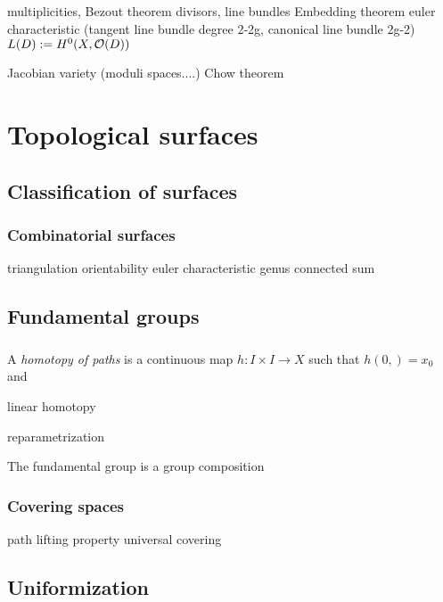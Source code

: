 \documentclass{../../large}
\begin{document}
multiplicities, Bezout theorem
divisors, line bundles
Embedding theorem
euler characteristic
(tangent line bundle degree 2-2g, canonical line bundle 2g-2)
$L(D):=H^0(X,\mathcal{O}(D))$

Jacobian variety (moduli spaces....)
Chow theorem




\part{Topological surfaces}

\chapter{Classification of surfaces}
\section{Combinatorial surfaces}

triangulation
orientability
euler characteristic
genus
connected sum


\chapter{Fundamental groups}

\section{}
\begin{prb}
A \emph{homotopy of paths} is a continuous map $h:I\times I\to X$ such that $h(0,)=x_0$ and 
\begin{parts}
\item linear homotopy
\item reparametrization
\end{parts}
\end{prb}
\begin{prb}
The fundamental group is a group
composition
\end{prb}

\begin{prb}
\end{prb}

\section{Covering spaces}

path lifting property
universal covering

\chapter{Uniformization}

\iffalse
\section{Symmetry groups}
isometry, conformal, rigid motion, etc.
\section{Discrete subgroups}
continuous group actions?
(convex, locally finite) fundamental domains
tesselation, polygon theorem
Fuchsian and Kleinian
\fi
\end{document}
